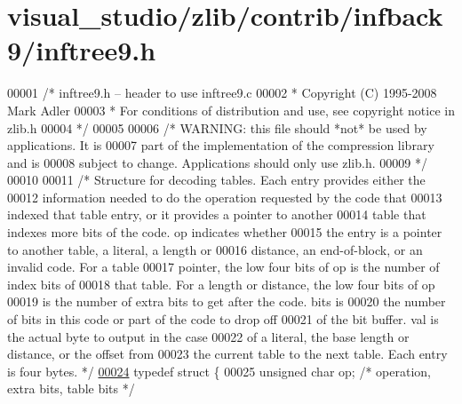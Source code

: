 \hypertarget{visual__studio_2zlib_2contrib_2infback9_2inftree9_8h_source}{}\section{visual\+\_\+studio/zlib/contrib/infback9/inftree9.h}
\label{visual__studio_2zlib_2contrib_2infback9_2inftree9_8h_source}

\begin{DoxyCode}
00001 \textcolor{comment}{/* inftree9.h -- header to use inftree9.c}
00002 \textcolor{comment}{ * Copyright (C) 1995-2008 Mark Adler}
00003 \textcolor{comment}{ * For conditions of distribution and use, see copyright notice in zlib.h}
00004 \textcolor{comment}{ */}
00005 
00006 \textcolor{comment}{/* WARNING: this file should *not* be used by applications. It is}
00007 \textcolor{comment}{   part of the implementation of the compression library and is}
00008 \textcolor{comment}{   subject to change. Applications should only use zlib.h.}
00009 \textcolor{comment}{ */}
00010 
00011 \textcolor{comment}{/* Structure for decoding tables.  Each entry provides either the}
00012 \textcolor{comment}{   information needed to do the operation requested by the code that}
00013 \textcolor{comment}{   indexed that table entry, or it provides a pointer to another}
00014 \textcolor{comment}{   table that indexes more bits of the code.  op indicates whether}
00015 \textcolor{comment}{   the entry is a pointer to another table, a literal, a length or}
00016 \textcolor{comment}{   distance, an end-of-block, or an invalid code.  For a table}
00017 \textcolor{comment}{   pointer, the low four bits of op is the number of index bits of}
00018 \textcolor{comment}{   that table.  For a length or distance, the low four bits of op}
00019 \textcolor{comment}{   is the number of extra bits to get after the code.  bits is}
00020 \textcolor{comment}{   the number of bits in this code or part of the code to drop off}
00021 \textcolor{comment}{   of the bit buffer.  val is the actual byte to output in the case}
00022 \textcolor{comment}{   of a literal, the base length or distance, or the offset from}
00023 \textcolor{comment}{   the current table to the next table.  Each entry is four bytes. */}
\hyperlink{structcode}{00024} \textcolor{keyword}{typedef} \textcolor{keyword}{struct }\{
00025     \textcolor{keywordtype}{unsigned} \textcolor{keywordtype}{char} op;           \textcolor{comment}{/* operation, extra bits, table bits */}

\end{DoxyCode}
